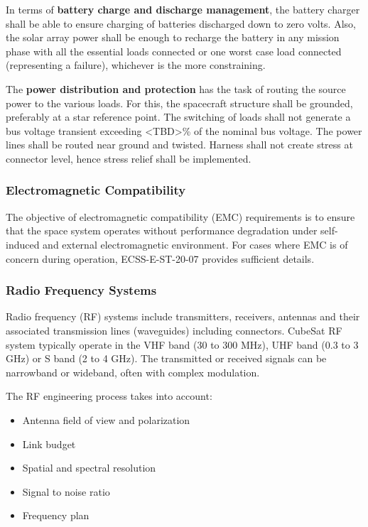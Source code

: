 In terms of \textbf{battery charge and discharge management}, the battery charger shall be able to ensure charging of batteries discharged down to zero volts. Also, the solar array power shall be enough to recharge the battery in any mission phase with all the essential loads connected or one worst case load connected (representing a failure), whichever is the more constraining.

The \textbf{power distribution and protection} has the task of routing the source power to the various loads. For this, the spacecraft structure shall be grounded, preferably at a star reference point. The switching of loads shall not generate a bus voltage transient exceeding <TBD>\% of the nominal bus voltage. The power lines shall be routed near ground and twisted. Harness shall not create stress at connector level, hence stress relief shall be implemented.

\subsubsection{Electromagnetic Compatibility}

The objective of electromagnetic compatibility (EMC) requirements is to ensure that the space system operates without performance degradation under self-induced and external electromagnetic environment. For cases where EMC is of concern during operation, ECSS-E-ST-20-07 \cite{} provides sufficient details.

\subsubsection{Radio Frequency Systems}

Radio frequency (RF) systems include transmitters, receivers, antennas and their  associated transmission lines (waveguides) including connectors. CubeSat RF system typically operate in the VHF band (30 to 300 MHz), UHF band (0.3 to 3 GHz) or S band (2 to 4 GHz). The transmitted or received signals can be narrowband or wideband, often with complex modulation. 

The RF engineering process takes into account:

\begin{itemize}
\item Antenna field of view and polarization
\item Link budget
\item Spatial and spectral resolution
\item Signal to noise ratio
\item Frequency plan
\end{itemize}

